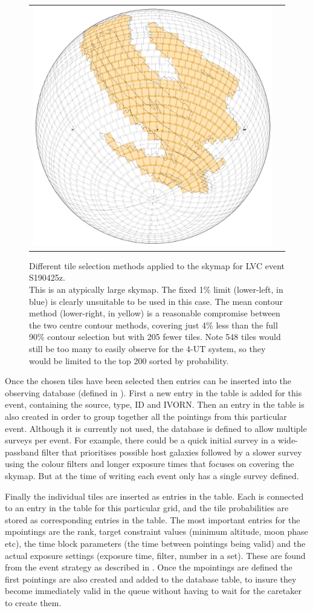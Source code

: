 \begin{colsection}
\begin{colsection}
\begin{figure}[p]
\begin{center}
\begin{tabular}{cc}
            \includegraphics[width=0.25\linewidth]{images/tiling/3_b.png} \\
        \end{tabular}
    \end{center}
    \caption[Different tile selection methods for S190425z]{
        Different tile selection methods applied to the skymap for LVC event S190425z.\\
        This is an atypically large skymap. The fixed 1\% limit (lower-left, in blue) is clearly unsuitable to be used in this case. The mean contour method (lower-right, in yellow) is a reasonable compromise between the two centre contour methods, covering just 4\% less than the full 90\% contour selection but with 205 fewer tiles. Note 548 tiles would still be too many to easily observe for the 4-UT system, so they would be limited to the top 200 sorted by probability.
    }\label{fig:tiling_S190425z}
\end{figure}

\clearpage

Once the chosen tiles have been selected then entries can be inserted into the observing database (defined in ). First a new entry in the  table is added for this event, containing the source, type, ID and IVORN. Then an entry in the  table is also created in order to group together all the pointings from this particular event. Although it is currently not used, the database is defined to allow multiple surveys per event. For example, there could be a quick initial survey in a wide-passband filter that prioritises possible host galaxies followed by a slower survey using the colour filters and longer exposure times that focuses on covering the skymap. But at the time of writing each event only has a single survey defined.

Finally the individual tiles are inserted as entries in the  table. Each is connected to an entry in the  table for this particular grid, and the tile probabilities are stored as corresponding entries in the  table. The most important entries for the mpointings are the rank, target constraint values (minimum altitude, moon phase etc), the time block parameters (the time between pointings being valid) and the actual exposure settings (exposure time, filter, number in a set). These are found from the event strategy as described in . Once the mpointings are defined the first pointings are also created and added to the database  table, to insure they become immediately valid in the queue without having to wait for the caretaker to create them.


\end{colsection}
\end{colsection}
